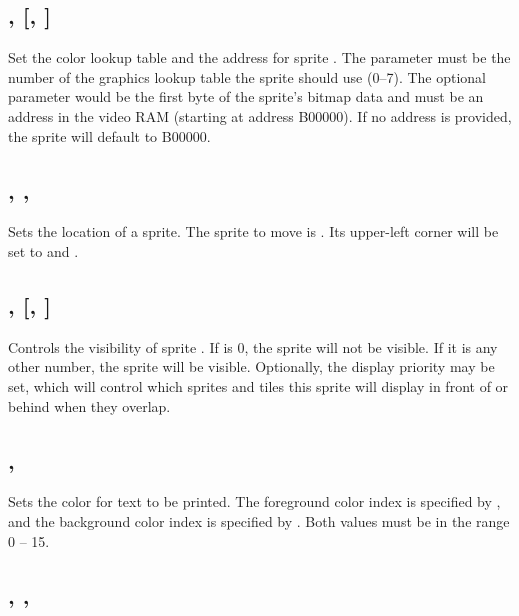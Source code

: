 \documentclass{report}
\begin{document}
    \subsection*{ ,  [,  ]}

    Set the color lookup table and the address for sprite .
    The parameter  must be the number of the graphics lookup table the
    sprite should use (0--7).
    The optional parameter  would be the first byte of the sprite's
    bitmap data and must be an address in the video RAM (starting at address B00000).
    If no address is provided, the sprite will default to B00000.

    \subsection*{ , , }

    Sets the location of a sprite.
    The sprite to move is .
    Its upper-left corner will be set to  and .

    \subsection*{ ,  [,  ]}

    Controls the visibility of sprite .
    If  is 0, the sprite will not be visible.
    If it is any other number, the sprite will be visible.
    Optionally, the display priority  may be set, which will control
    which sprites and tiles this sprite will display in front of or behind when
    they overlap.

    \subsection*{ , }

    Sets the color for text to be printed.
    The foreground color index is specified by ,
    and the background color index is specified by .
    Both values must be in the range 0 -- 15.

    \subsection*{ , , }
\end{document}
